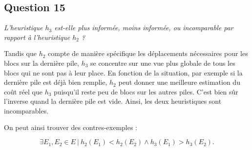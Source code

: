 \subsection{Question 15}

\textit{L'heuristique $h_3$ est-elle plus informée, moins informée, ou incomparable par rapport à l'heuristique $h_2$ ?}

Tandis que $h_2$ compte de manière spécifique les déplacements nécessaires pour les blocs sur la dernière pile, $h_3$ se concentre sur une vue plus globale de tous les blocs qui ne sont pas à leur place. En fonction de la situation, par exemple si la dernière pile est déjà bien remplie, $h_2$ peut donner une meilleure estimation du coût réel que $h_3$ puisqu'il reste peu de blocs sur les autres piles. C'est bien sûr l'inverse quand la dernière pile est vide. Ainsi, les deux heuristiques sont incomparables.

On peut ainsi trouver des contres-exemples :

\[
    \exists E_1, E_2 \in E \ | \ h_2(E_1) < h_2(E_2) \land h_3(E_1) > h_3(E_2).
\]


